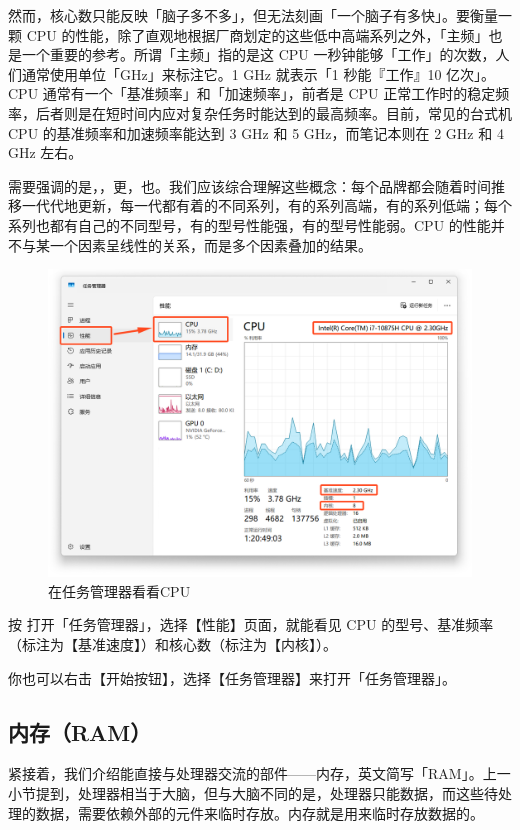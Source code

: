 然而，核心数只能反映「脑子多不多」，但无法刻画「一个脑子有多快」。要衡量一颗 CPU 的性能，除了直观地根据厂商划定的这些低中高端系列之外，「主频」也是一个重要的参考。所谓「主频」指的是这 CPU 一秒钟能够「工作」的次数，人们通常使用单位「GHz」来标注它。1 GHz 就表示「1 秒能『工作』10 亿次」。CPU 通常有一个「基准频率」和「加速频率」，前者是 CPU 正常工作时的稳定频率，后者则是在短时间内应对复杂任务时能达到的最高频率。目前，常见的台式机 CPU 的基准频率和加速频率能达到 3 GHz 和 5 GHz，而笔记本则在 2 GHz 和 4 GHz 左右。

需要强调的是，，更，也。我们应该综合理解这些概念：每个品牌都会随着时间推移一代代地更新，每一代都有着的不同系列，有的系列高端，有的系列低端；每个系列也都有自己的不同型号，有的型号性能强，有的型号性能弱。CPU 的性能并不与某一个因素呈线性的关系，而是多个因素叠加的结果。

\begin{figure}[htb!]
  \centering
  \includegraphics[width=.65\textwidth]{assets/basic/Check_CPU.png}
  \caption{在任务管理器看看CPU}
  \label{fig:Check_CPU}
\end{figure}

按  打开「任务管理器」，选择【性能】页面，就能看见 CPU 的型号、基准频率（标注为【基准速度】）和核心数（标注为【内核】）。

\begin{note}
  你也可以右击【开始按钮】，选择【任务管理器】来打开「任务管理器」。
\end{note}

\subsection{内存（RAM）}

紧接着，我们介绍能直接与处理器交流的部件——内存，英文简写「RAM」。上一小节提到，处理器相当于大脑，但与大脑不同的是，处理器只能数据，而这些待处理的数据，需要依赖外部的元件来临时存放。内存就是用来临时存放数据的。


